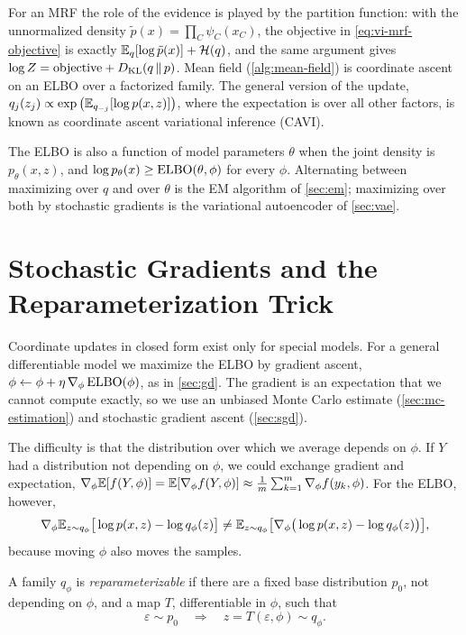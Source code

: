 \begin{remark}
For an MRF the role of the evidence is played by the partition function: with the unnormalized density $\tilde p(x)=\prod_C\psi_C(x_C)$, the objective in \eqref{eq:vi-mrf-objective} is exactly $\mathbb{E}_q[\log\tilde p(x)]+\mathcal{H}(q)$, and the same argument gives $\log Z=\text{objective}+D_{\mathrm{KL}}(q\,\|\,p)$. Mean field (\cref{alg:mean-field}) is coordinate ascent on an ELBO over a factorized family. The general version of the update, $q_j(z_j)\propto\exp\big(\mathbb{E}_{q_{-j}}[\log p(x,z)]\big)$, where the expectation is over all other factors, is known as coordinate ascent variational inference (CAVI).
\end{remark}

\begin{remark}[Connection to EM]
The ELBO is also a function of model parameters $\theta$ when the joint density is $p_\theta(x,z)$, and $\log p_\theta(x)\ge\operatorname{ELBO}(\theta,\phi)$ for every $\phi$. Alternating between maximizing over $q$ and over $\theta$ is the EM algorithm of \cref{sec:em}; maximizing over both by stochastic gradients is the variational autoencoder of \cref{sec:vae}.
\end{remark}

\section{Stochastic Gradients and the Reparameterization Trick}\label{sec:reparam}

Coordinate updates in closed form exist only for special models. For a general differentiable model we maximize the ELBO by gradient ascent, $\phi\gets\phi+\eta\,\nabla_\phi\operatorname{ELBO}(\phi)$, as in \cref{sec:gd}. The gradient is an expectation that we cannot compute exactly, so we use an unbiased Monte Carlo estimate (\cref{sec:mc-estimation}) and stochastic gradient ascent (\cref{sec:sgd}).

The difficulty is that the distribution over which we average depends on $\phi$. If $Y$ had a distribution not depending on $\phi$, we could exchange gradient and expectation, $\nabla_\phi\mathbb{E}[f(Y,\phi)]=\mathbb{E}[\nabla_\phi f(Y,\phi)]\approx\frac1m\sum_{k=1}^m\nabla_\phi f(y_k,\phi)$. For the ELBO, however,
\[
\nabla_\phi\mathbb{E}_{z\sim q_\phi}\big[\log p(x,z)-\log q_\phi(z)\big]\ne\mathbb{E}_{z\sim q_\phi}\big[\nabla_\phi\big(\log p(x,z)-\log q_\phi(z)\big)\big],
\]
because moving $\phi$ also moves the samples.

\begin{definition}[Reparameterization]\label{def:reparam}
A family $q_\phi$ is \emph{reparameterizable} if there are a fixed base distribution $p_0$, not depending on $\phi$, and a map $T$, differentiable in $\phi$, such that
\[
\varepsilon\sim p_0\quad\Longrightarrow\quad z=T(\varepsilon,\phi)\sim q_\phi .
\]
\end{definition}

